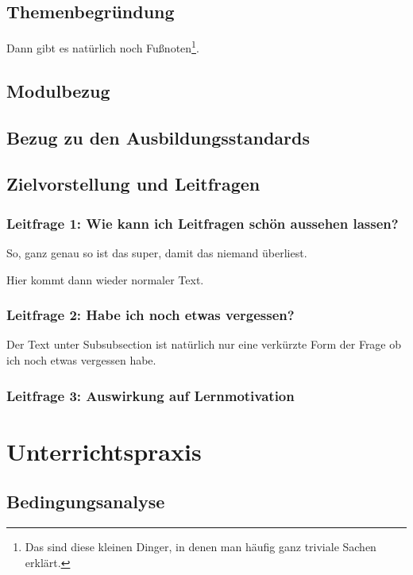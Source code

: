 \documentclass[a4paper, 12pt]{article}
\begin{document}
\subsection{Themenbegründung}
\label{darIchNichtVergessenUntenEinzufuegen}

Dann gibt es natürlich noch Fußnoten\footnote{Das sind diese kleinen Dinger, in denen man häufig ganz triviale Sachen erklärt.}.


\subsection{Modulbezug}
\subsection{Bezug zu den Ausbildungsstandards}
\subsection{Zielvorstellung und Leitfragen}

\subsubsection{Leitfrage 1: Wie kann ich Leitfragen schön aussehen lassen?}
\begin{tcolorbox}
So, ganz genau so ist das super, damit das niemand überliest.
\end{tcolorbox}
Hier kommt dann wieder normaler Text.

\subsubsection{Leitfrage 2: Habe ich noch etwas vergessen?}
\begin{tcolorbox}
Der Text unter Subsubsection ist natürlich nur eine verkürzte Form der Frage ob ich noch etwas vergessen habe.
\end{tcolorbox}

\subsubsection{Leitfrage 3: Auswirkung auf Lernmotivation}

\newpage
\section{Unterrichtspraxis}
\subsection{Bedingungsanalyse}
\end{document}
